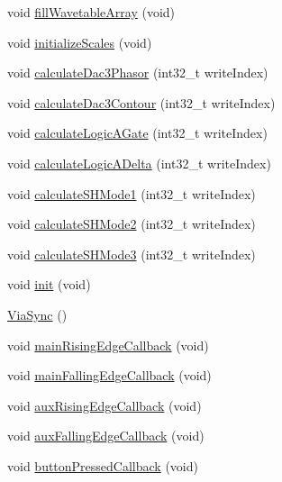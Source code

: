 \begin{DoxyCompactItemize}
\item 
void \mbox{\hyperlink{class_via_sync_ac961c167438b6631f763d9dbe3d07551}{fill\+Wavetable\+Array}} (void)
\item 
void \mbox{\hyperlink{class_via_sync_a0baf27aa03ec9eb89c09fdef6f13aeb8}{initialize\+Scales}} (void)
\item 
void \mbox{\hyperlink{class_via_sync_a2a2007c2ef3ce0d5de112c913ddb1563}{calculate\+Dac3\+Phasor}} (int32\+\_\+t write\+Index)
\item 
void \mbox{\hyperlink{class_via_sync_ac15a3cb78025e1b94fbd16297a7e7226}{calculate\+Dac3\+Contour}} (int32\+\_\+t write\+Index)
\item 
void \mbox{\hyperlink{class_via_sync_a861669d9ba9d995ee259a0ba66866881}{calculate\+Logic\+A\+Gate}} (int32\+\_\+t write\+Index)
\item 
void \mbox{\hyperlink{class_via_sync_a278dbb427e06ae105fd424f27e1085a6}{calculate\+Logic\+A\+Delta}} (int32\+\_\+t write\+Index)
\item 
void \mbox{\hyperlink{class_via_sync_abdb8461ced79404e76aa4150b45f8a10}{calculate\+S\+H\+Mode1}} (int32\+\_\+t write\+Index)
\item 
void \mbox{\hyperlink{class_via_sync_abc24bde577af46a0788d9df853867f06}{calculate\+S\+H\+Mode2}} (int32\+\_\+t write\+Index)
\item 
void \mbox{\hyperlink{class_via_sync_a91ecdc9caf9426271a0e28d9be0d8588}{calculate\+S\+H\+Mode3}} (int32\+\_\+t write\+Index)
\item 
void \mbox{\hyperlink{class_via_sync_ad3d72949ba2ba10d8ed2da9a398f7d15}{init}} (void)
\item 
\mbox{\hyperlink{class_via_sync_ac2661b7767cc423d2e97651cc75b04a3}{Via\+Sync}} ()
\item 
void \mbox{\hyperlink{class_via_sync_acf9bcb2f9e7ff050906e527ca2418875}{main\+Rising\+Edge\+Callback}} (void)
\item 
void \mbox{\hyperlink{class_via_sync_a7cbf13fbfc58835d97976b478ee00dd6}{main\+Falling\+Edge\+Callback}} (void)
\item 
void \mbox{\hyperlink{class_via_sync_a45865d44b380716e874853e4437e158d}{aux\+Rising\+Edge\+Callback}} (void)
\item 
void \mbox{\hyperlink{class_via_sync_a6c505fc93b2693b98d01b0bed50cff4a}{aux\+Falling\+Edge\+Callback}} (void)
\item 
void \mbox{\hyperlink{class_via_sync_a437a132f9edf0ee19dd965c46a7147c6}{button\+Pressed\+Callback}} (void)
\item 

\end{DoxyCompactItemize}
